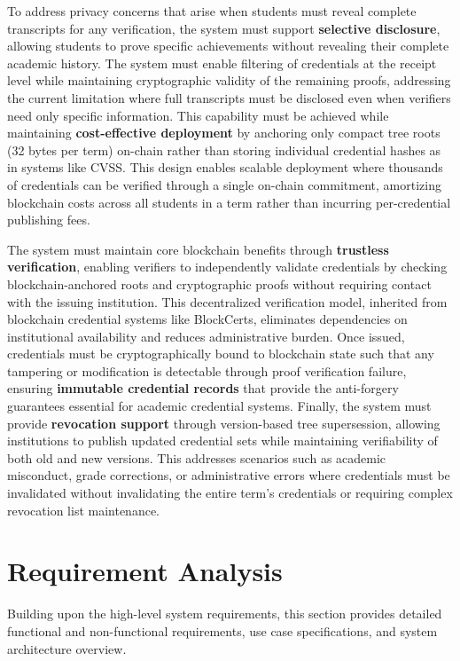 To address privacy concerns that arise when students must reveal complete transcripts for any verification, the system must support \textbf{selective disclosure}, allowing students to prove specific achievements without revealing their complete academic history. The system must enable filtering of credentials at the receipt level while maintaining cryptographic validity of the remaining proofs, addressing the current limitation where full transcripts must be disclosed even when verifiers need only specific information. This capability must be achieved while maintaining \textbf{cost-effective deployment} by anchoring only compact tree roots (32 bytes per term) on-chain rather than storing individual credential hashes as in systems like CVSS. This design enables scalable deployment where thousands of credentials can be verified through a single on-chain commitment, amortizing blockchain costs across all students in a term rather than incurring per-credential publishing fees.

The system must maintain core blockchain benefits through \textbf{trustless verification}, enabling verifiers to independently validate credentials by checking blockchain-anchored roots and cryptographic proofs without requiring contact with the issuing institution. This decentralized verification model, inherited from blockchain credential systems like BlockCerts, eliminates dependencies on institutional availability and reduces administrative burden. Once issued, credentials must be cryptographically bound to blockchain state such that any tampering or modification is detectable through proof verification failure, ensuring \textbf{immutable credential records} that provide the anti-forgery guarantees essential for academic credential systems. Finally, the system must provide \textbf{revocation support} through version-based tree supersession, allowing institutions to publish updated credential sets while maintaining verifiability of both old and new versions. This addresses scenarios such as academic misconduct, grade corrections, or administrative errors where credentials must be invalidated without invalidating the entire term's credentials or requiring complex revocation list maintenance.

\section{Requirement Analysis}
\label{sec:requirement-analysis}

Building upon the high-level system requirements, this section provides detailed functional and non-functional requirements, use case specifications, and system architecture overview.

